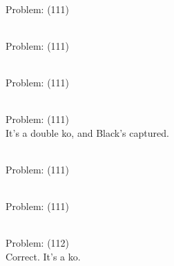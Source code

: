 \documentclass[11pt]{article}
\begin{document}
\begin{minipage}[t]{0.5\textwidth}
  {\centering
  
\\
Problem: (111)\\
  }
\end{minipage}
\begin{minipage}[t]{0.5\textwidth}
  {\centering
  
\\
Problem: (111)\\
  }
\end{minipage}
\begin{minipage}[t]{0.5\textwidth}
  {\centering
  
\\
Problem: (111)\\
  }
\end{minipage}
\begin{minipage}[t]{0.5\textwidth}
  {\centering
  
\\
Problem: (111)\\
It's a double ko, and Black's captured.\\
  }
\end{minipage}
\begin{minipage}[t]{0.5\textwidth}
  {\centering
  
\\
Problem: (111)\\
  }
\end{minipage}
\begin{minipage}[t]{0.5\textwidth}
  {\centering
  
\\
Problem: (111)\\
  }
\end{minipage}
\begin{minipage}[t]{0.5\textwidth}
  {\centering
  
\\
Problem: (112)\\
Correct. It's a ko.\\
  }
\end{minipage}
\end{document}
